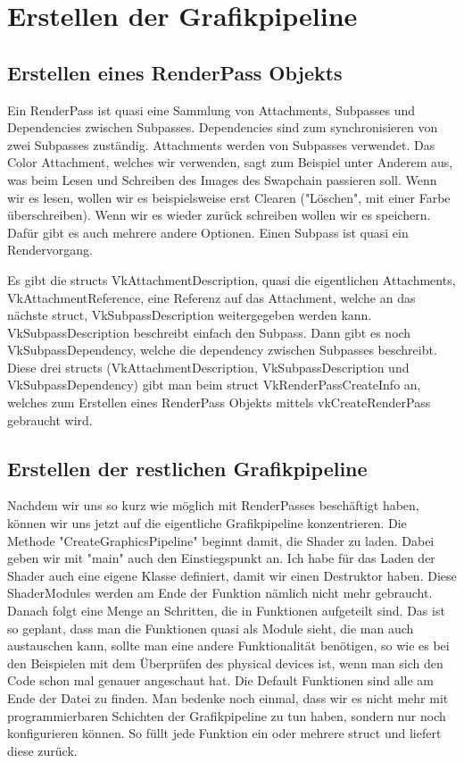 \documentclass[11pt,a4paper]{report}
\begin{document}
\section{Erstellen der Grafikpipeline}
\subsection{Erstellen eines RenderPass Objekts}
Ein RenderPass ist quasi eine Sammlung von Attachments, Subpasses und Dependencies zwischen Subpasses. Dependencies sind zum synchronisieren von zwei Subpasses zuständig. Attachments werden von Subpasses verwendet. Das Color Attachment, welches wir verwenden, sagt zum Beispiel unter Anderem aus, was beim Lesen und Schreiben des Images des Swapchain passieren soll. Wenn wir es lesen, wollen wir es beispielsweise erst Clearen ("Löschen", mit einer Farbe überschreiben). Wenn wir es wieder zurück schreiben wollen wir es speichern. Dafür gibt es auch mehrere andere Optionen. Einen Subpass ist quasi ein Rendervorgang.

Es gibt die structs VkAttachmentDescription, quasi die eigentlichen Attachments, VkAttachmentReference, eine Referenz auf das Attachment, welche an das nächste struct, VkSubpassDescription weitergegeben werden kann. VkSubpassDescription beschreibt einfach den Subpass. Dann gibt es noch VkSubpassDependency, welche die dependency zwischen Subpasses beschreibt. Diese drei structs (VkAttachmentDescription, VkSubpassDescription und VkSubpassDependency) gibt man beim struct VkRenderPassCreateInfo an, welches zum Erstellen eines RenderPass Objekts mittels vkCreateRenderPass gebraucht wird.

\subsection{Erstellen der restlichen Grafikpipeline}
Nachdem wir uns so kurz wie möglich mit RenderPasses beschäftigt haben, können wir uns jetzt auf die eigentliche Grafikpipeline konzentrieren. Die Methode "CreateGraphicsPipeline" beginnt damit, die Shader zu laden. Dabei geben wir mit "main" auch den Einstiegspunkt an. Ich habe für das Laden der Shader auch eine eigene Klasse definiert, damit wir einen Destruktor haben. Diese ShaderModules werden am Ende der Funktion nämlich nicht mehr gebraucht. Danach folgt eine Menge an Schritten, die in Funktionen aufgeteilt sind. Das ist so geplant, dass man die Funktionen quasi als Module sieht, die man auch austauschen kann, sollte man eine andere Funktionalität benötigen, so wie es bei den Beispielen mit dem Überprüfen des physical devices ist, wenn man sich den Code schon mal genauer angeschaut hat. Die Default Funktionen sind alle am Ende der Datei zu finden. Man bedenke noch einmal, dass wir es nicht mehr mit programmierbaren Schichten der Grafikpipeline zu tun haben, sondern nur noch konfigurieren können. So füllt jede Funktion ein oder mehrere struct und liefert diese zurück.
\end{document}
